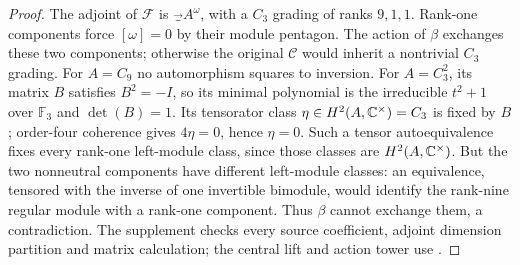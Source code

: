 \begin{proof}
The adjoint of $\mathcal F$ is $\Vec_A^\omega$, with a $C_3$ grading
of ranks $9,1,1$. Rank-one components force $[\omega]=0$ by their
module pentagon. The action of $\beta$ exchanges these two components;
otherwise the original $\mathcal C$ would inherit a nontrivial
$C_3$ grading. For $A=C_9$ no automorphism squares to inversion.
For $A=C_3^2$, its matrix $B$ satisfies $B^2=-I$, so its minimal
polynomial is the irreducible $t^2+1$ over $\mathbb F_3$ and
$\det(B)=1$. Its tensorator class
$\eta\in H^2(A,\mathbb C^\times)=C_3$ is fixed by $B$; order-four
coherence gives $4\eta=0$, hence $\eta=0$.
Such a tensor autoequivalence fixes every rank-one left-module class,
since those classes are $H^2(A,\mathbb C^\times)$. But the two nonneutral
components have different left-module classes: an equivalence,
tensored with the inverse of one invertible bimodule, would identify
the rank-nine regular module with a rank-one component.
Thus $\beta$ cannot exchange them, a contradiction. The supplement
checks every source coefficient, adjoint dimension partition and
matrix calculation; the central lift and action tower use
\cite{GNN,DGNO,ENOSolvable}.
\end{proof}
